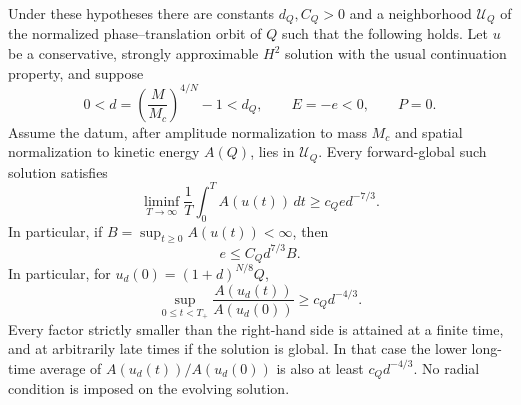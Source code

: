 \begin{theorem}
\label{thm:r13-quadratic-drift}
Under these hypotheses there are constants $d_Q,C_Q>0$ and a
neighborhood $\mathcal U_Q$ of the normalized phase--translation orbit
of $Q$ such that the following holds. Let $u$ be a conservative,
strongly approximable $H^2$ solution with the usual continuation
property, and suppose
\[
 0<d=\left(\frac{M}{M_c}\right)^{4/N}-1<d_Q,
 \qquad E=-e<0,\qquad P=0.
\]
Assume the datum, after amplitude normalization to mass $M_c$ and
spatial normalization to kinetic energy $A(Q)$, lies in
$\mathcal U_Q$. Every forward-global such solution satisfies
\begin{equation}\label{eq:r13-seven-thirds-average}
 \liminf_{T\to\infty}\frac1T\int_0^T A(u(t))\,dt
 \ge c_Q e d^{-7/3}.
\end{equation}
In particular, if $B=\sup_{t\ge0}A(u(t))<\infty$, then
\begin{equation}\label{eq:r13-seven-thirds}
 e\le C_Q d^{7/3}B.
\end{equation}
In particular, for
$u_d(0)=(1+d)^{N/8}Q$,
\begin{equation}\label{eq:r13-four-thirds}
 \sup_{0\le t<T_+}\frac{A(u_d(t))}{A(u_d(0))}
 \ge c_Qd^{-4/3}.
\end{equation}
Every factor strictly smaller than the right-hand side is attained at
a finite time, and at arbitrarily late times if the solution is global.
In that case the lower long-time average of $A(u_d(t))/A(u_d(0))$ is
also at least $c_Qd^{-4/3}$.
No radial condition is imposed on the evolving solution.
\end{theorem}

